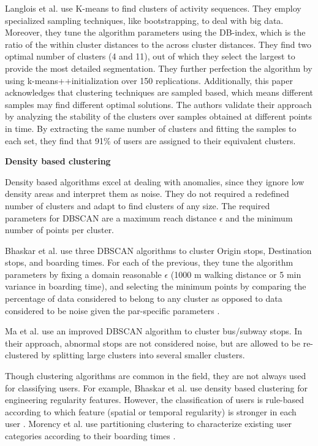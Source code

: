 \documentclass{article}
\begin{document}
Langlois et al. use K-means to find clusters of activity sequences. They employ specialized sampling techniques, like bootstrapping, to deal with big data.  Moreover, they tune the algorithm parameters using the DB-index, which is the ratio of the within cluster distances to the across cluster distances. They find two optimal number of clusters (4 and 11), out of which they select the largest to provide the most detailed segmentation. They further perfection the algorithm by using k-means++initialization over 150 replications. Additionally, this paper acknowledges that clustering techniques are sampled based, which means different samples may find different optimal solutions. The authors validate their approach by analyzing the stability of the clusters over samples obtained at different points in time. By extracting the same number of clusters and fitting the samples to each set, they find that 91\% of users are assigned to their equivalent clusters. \cite{langlois2016inferring}


\textbf{Density based clustering}

Density based algorithms excel at dealing with anomalies, since they ignore low density areas and interpret them as noise. They do not required a redefined number of clusters and adapt to find clusters of any size. The required parameters for DBSCAN are a maximum reach distance $\epsilon$ and the minimum number of points per cluster.

Bhaskar et al. use three DBSCAN algorithms to cluster Origin stops, Destination stops, and boarding times. For each of the previous, they tune the algorithm parameters by fixing a domain reasonable $\epsilon$ (1000 m walking distance or 5 min variance in boarding time), and selecting the minimum points by comparing the percentage of data considered to belong to any cluster as opposed to data considered to be noise given the par-specific parameters \cite{bhaskar2015passenger}. 

Ma et al. use an improved DBSCAN algorithm to cluster bus/subway stops. In their approach, abnormal stops are not considered noise, but are allowed to be re-clustered by splitting large clusters into several smaller clusters. 

Though clustering algorithms are common in the field, they are not always used for classifying users. For example, Bhaskar et al. use density based clustering for engineering regularity features. However, the classification of users is rule-based according to which feature (spatial or temporal regularity) is stronger in each user \cite{bhaskar2015passenger}. Morency et al. use partitioning clustering to characterize existing user categories according to their boarding times \cite{morency2007measuring}. 
\end{document}
